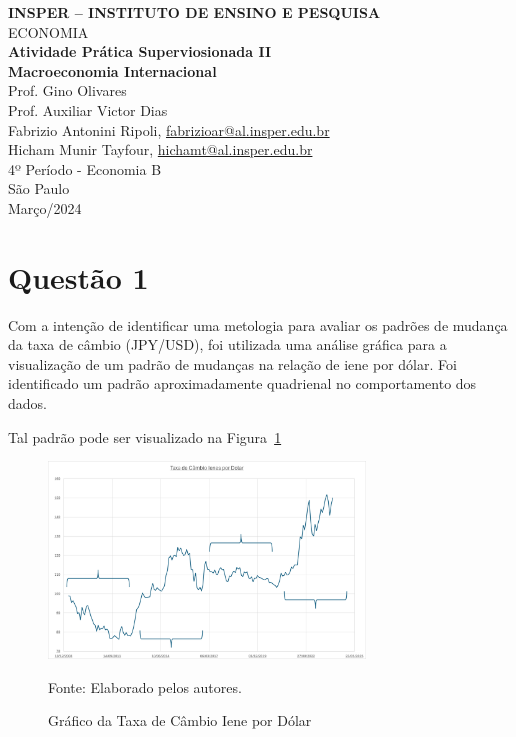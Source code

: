 \documentclass[a4paper,12pt]{article}[abntex2]
\begin{document}
\begin{titlepage}
    \centering
    \vspace*{1cm}
    \Large\textbf{INSPER – INSTITUTO DE ENSINO E PESQUISA}\\
    \Large ECONOMIA\\
    \vspace{1.5cm}
    \Large\textbf{Atividade Prática Superviosionada II}\\
    \textbf{Macroeconomia Internacional}\\
    \vspace{1.5cm}
    Prof. Gino Olivares\\
    Prof. Auxiliar Victor Dias \\
    \vfill
    \normalsize
    Fabrizio Antonini Ripoli, \href{mailto:fabrizioar@al.insper.edu.br}{fabrizioar@al.insper.edu.br}\\
    Hicham Munir Tayfour, \href{mailto:hichamt@al.insper.edu.br}{hichamt@al.insper.edu.br}\\
    4º Período - Economia B\\
    \vfill
    São Paulo\\
    Março/2024
\end{titlepage}

\newpage
\tableofcontents
\thispagestyle{empty} %
\newpage
\setcounter{page}{1} %
\justify
\onehalfspacing

\pagestyle{fancy}
\fancyhf{}
\rhead{\thepage}

\section{\textbf{Questão 1}}
Com a intenção de identificar uma metologia para avaliar os padrões de mudança da taxa de câmbio (JPY/USD), foi utilizada uma análise gráfica para a visualização de um padrão de mudanças na relação de iene por dólar. Foi identificado um padrão aproximadamente quadrienal no comportamento dos dados. 

Tal padrão pode ser visualizado na Figura~\ref{fig:cambio}
 \begin{figure}[H]
    \centering
    \caption{Gráfico da Taxa de Câmbio Iene por Dólar} 
    \includegraphics[width=0.75\textwidth]{Câmbio Iene Dolar.png}
    \label{fig:cambio}
    
    \footnotesize{Fonte: Elaborado pelos autores.}
    \end{figure}
\end{document}

